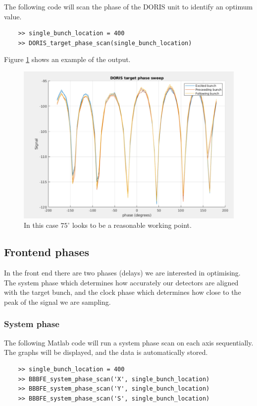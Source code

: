 \documentclass{report}
\begin{document}
The following code will scan the phase of the DORIS unit to identify an optimum value. 
\begin{verbatim}
    >> single_bunch_location = 400
    >> DORIS_target_phase_scan(single_bunch_location) 
\end{verbatim}
Figure \ref{fig:DORIS_phase_scan} shows an example of the output.
\begin{figure}[h]
    \centering
    \includegraphics[width=0.8\linewidth]{DORIS_scan.png}
    \caption{In this case $75^\circ$ looks to be a reasonable working point.}
    \label{fig:DORIS_phase_scan}
\end{figure}

\clearpage
\subsection{Frontend phases} 
In the front end there are two phases (delays) we are interested in optimising. The system phase which determines how accurately our detectors are aligned with the target bunch, and the clock phase which determines how close to the peak of the signal we are sampling. 
\subsubsection{System phase}
 
The following Matlab code will run a system phase scan on each axis sequentially. The graphs will be displayed, and the data is automatically stored. 

\begin{verbatim}
    >> single_bunch_location = 400
    >> BBBFE_system_phase_scan('X', single_bunch_location)
    >> BBBFE_system_phase_scan('Y', single_bunch_location)
    >> BBBFE_system_phase_scan('S', single_bunch_location)
\end{verbatim}
\end{document}
